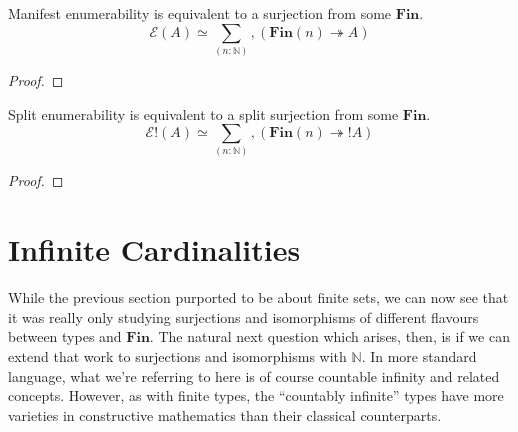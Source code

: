 \begin{lemma}
  Manifest enumerability is equivalent to a surjection from some \(\mathbf{Fin}\).
  \begin{equation}
    \mathcal{E}(A) \simeq \sum_{(n : \mathbb{N})} , \left(  \mathbf{Fin}(n) \twoheadrightarrow A \right)
  \end{equation}
\end{lemma}
\begin{proof}
\end{proof}

\begin{lemma}
  Split enumerability is equivalent to a split surjection from some \(\mathbf{Fin}\).
  \begin{equation}
    \mathcal{E}!(A) \simeq \sum_{(n : \mathbb{N})} , \left(  \mathbf{Fin}(n) \twoheadrightarrow ! A \right)
  \end{equation}
\end{lemma}
\begin{proof}
\end{proof}

\section{Infinite Cardinalities} \label{infinite-cardinalities}
While the previous section purported to be about finite sets, we can now see
that it was really only studying surjections and isomorphisms of different
flavours between types and \(\mathbf{Fin}\).
The natural next question which arises, then, is if we can extend that work to
surjections and isomorphisms with \(\mathbb{N}\).
In more standard language, what we're referring to here is of course
countable infinity and related concepts.
However, as with finite types, the ``countably infinite'' types have more
varieties in constructive mathematics than their classical counterparts.
